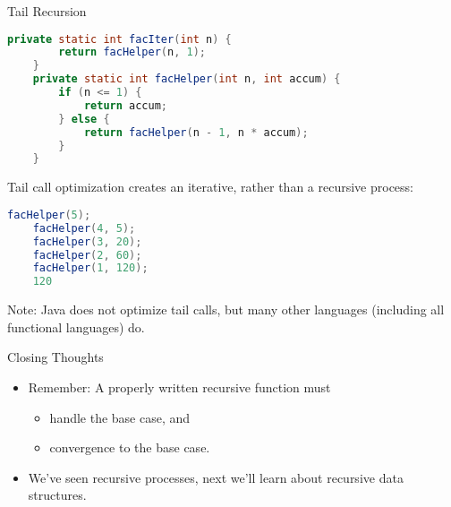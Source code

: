 \documentclass{beamer}
\begin{document}
\begin{frame}[fragile]{Tail Recursion}

\vspace{-.05in}
\begin{lstlisting}[language=Java]
    private static int facIter(int n) {
        return facHelper(n, 1);
    }
    private static int facHelper(int n, int accum) {
        if (n <= 1) {
            return accum;
        } else {
            return facHelper(n - 1, n * accum);
        }
    }
\end{lstlisting}
\vspace{-.05in}
Tail call optimization creates an iterative, rather than a recursive process:
\vspace{-.05in}
\begin{lstlisting}[language=Java]
    facHelper(5);
    facHelper(4, 5);
    facHelper(3, 20);
    facHelper(2, 60);
    facHelper(1, 120);
    120
\end{lstlisting}
\vspace{-.05in}
Note: Java does not optimize tail calls, but many other languages (including all functional languages) do.

\end{frame}

\begin{frame}[fragile]{Closing Thoughts}


\begin{itemize}
\item Remember: A properly written recursive function must
\begin{itemize}
\item handle the base case, and
\item convergence to the base case.
\end{itemize}
\item We've seen recursive processes, next we'll learn about recursive data structures.
\end{itemize}


\end{frame}







\end{document}
